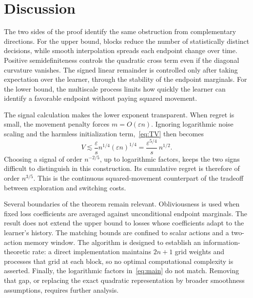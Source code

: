 \documentclass[11pt]{article}
\theoremstyle{definition}
\begin{document}
\section{Discussion}\label{sec:discussion}

The two sides of the proof identify the same obstruction from complementary directions. For the upper bound, blocks reduce the number of statistically distinct decisions, while smooth interpolation spreads each endpoint change over time. Positive semidefiniteness controls the quadratic cross term even if the diagonal curvature vanishes. The signed linear remainder is controlled only after taking expectation over the learner, through the stability of the endpoint marginals. For the lower bound, the multiscale process limits how quickly the learner can identify a favorable endpoint without paying squared movement.

The signal calculation makes the lower exponent transparent. When regret is small, the movement penalty forces $m=O(\varepsilon n)$. Ignoring logarithmic noise scaling and the harmless initialization term,~\eqref{eq:TV} then becomes
\[
 V\lesssim \frac{\varepsilon}{s}n^{1/4}(\varepsilon n)^{1/4}
 =\frac{\varepsilon^{5/4}}{s}\,n^{1/2}.
\]
Choosing a signal of order $n^{-2/5}$, up to logarithmic factors, keeps the two signs difficult to distinguish in this construction. Its cumulative regret is therefore of order $n^{3/5}$. This is the continuous squared-movement counterpart of the tradeoff between exploration and switching costs.

Several boundaries of the theorem remain relevant. Obliviousness is used when fixed loss coefficients are averaged against unconditional endpoint marginals. The result does not extend the upper bound to losses whose coefficients adapt to the learner's history. The matching bounds are confined to scalar actions and a two-action memory window. The algorithm is designed to establish an information-theoretic rate: a direct implementation maintains $2n+1$ grid weights and processes that grid at each block, so no optimal computational complexity is asserted. Finally, the logarithmic factors in~\eqref{eq:main} do not match. Removing that gap, or replacing the exact quadratic representation by broader smoothness assumptions, requires further analysis.
\end{document}

